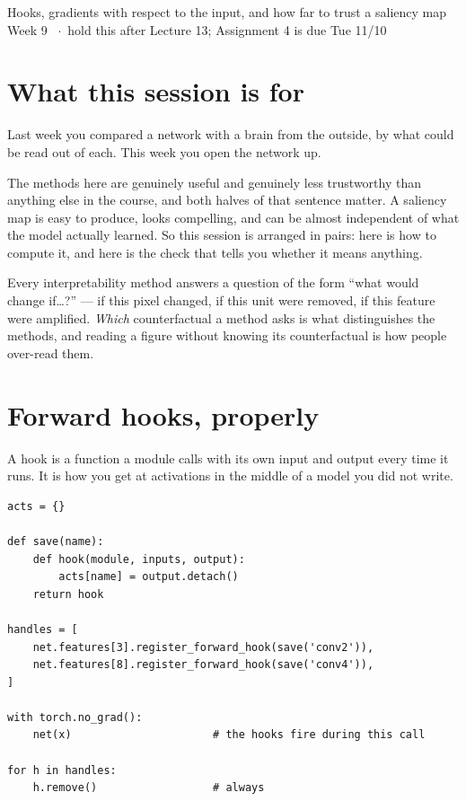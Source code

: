 \documentclass[11pt]{article}
\begin{document}
  {Hooks, gradients with respect to the input, and how far to trust a saliency map}
  {Week 9 \ $\cdot$\ hold this after Lecture 13; Assignment 4 is due Tue 11/10}

\section*{What this session is for}

Last week you compared a network with a brain from the outside, by what could be
read out of each. This week you open the network up.

The methods here are genuinely useful and genuinely less trustworthy than
anything else in the course, and both halves of that sentence matter. A saliency
map is easy to produce, looks compelling, and can be almost independent of what
the model actually learned. So this session is arranged in pairs: here is how to
compute it, and here is the check that tells you whether it means anything.

\begin{keybox}
 Every interpretability method answers a question of the form
``what would change if\dots?'' --- if this pixel changed, if this unit were
removed, if this feature were amplified. \emph{Which} counterfactual a method
asks is what distinguishes the methods, and reading a figure without knowing its
counterfactual is how people over-read them.
\end{keybox}

\section{Forward hooks, properly}

A hook is a function a module calls with its own input and output every time it
runs. It is how you get at activations in the middle of a model you did not
write.

\begin{lstlisting}
acts = {}

def save(name):
    def hook(module, inputs, output):
        acts[name] = output.detach()
    return hook

handles = [
    net.features[3].register_forward_hook(save('conv2')),
    net.features[8].register_forward_hook(save('conv4')),
]

with torch.no_grad():
    net(x)                      # the hooks fire during this call

for h in handles:
    h.remove()                  # always
\end{lstlisting}
\end{document}

